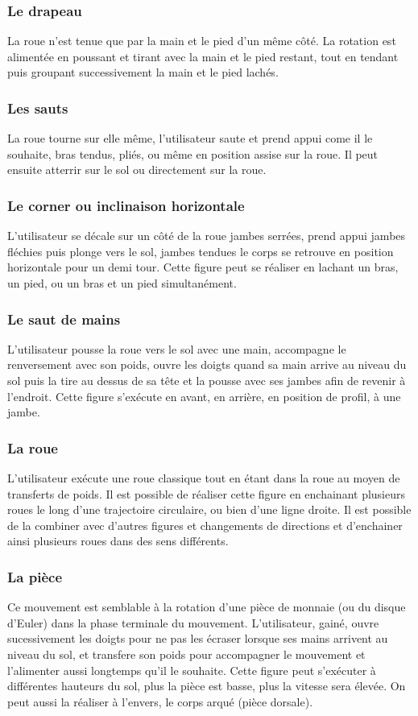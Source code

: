 \subsubsection{Le drapeau}
La roue n'est tenue que par la main et le pied d'un même côté. La rotation est alimentée en poussant et tirant avec la main et le pied restant, tout en tendant puis groupant successivement la main et le pied lachés.

\subsubsection{Les sauts}
La roue tourne sur elle même, l'utilisateur saute et prend appui come il le souhaite, bras tendus, pliés, ou même en position assise sur la roue. Il peut ensuite atterrir sur le sol ou directement sur la roue.

\subsubsection{Le corner ou inclinaison horizontale}
L'utilisateur se décale sur un côté de la roue jambes serrées, prend appui jambes fléchies puis plonge vers le sol, jambes tendues le corps se retrouve en position horizontale pour un demi tour. Cette figure peut se réaliser en lachant un bras, un pied, ou un bras et un pied simultanément.

\subsubsection{Le saut de mains}
L'utilisateur pousse la roue vers le sol avec une main, accompagne le renversement avec son poids, ouvre les doigts quand sa main arrive au niveau du sol puis la tire au dessus de sa tête et la pousse avec ses jambes afin de revenir à l'endroit. Cette figure s'exécute en avant, en arrière, en position de profil, à une jambe.

\subsubsection{La roue}
L'utilisateur exécute une roue classique tout en étant dans la roue au moyen de transferts de poids. Il est possible de réaliser cette figure en enchainant plusieurs roues le long d'une trajectoire circulaire, ou bien d'une ligne droite. Il est possible de la combiner avec d'autres figures et changements de directions et d'enchainer ainsi plusieurs roues dans des sens différents.

\subsubsection{La pièce}
Ce mouvement est semblable à la rotation d'une pièce de monnaie (ou du disque d'Euler) dans la phase terminale du mouvement. L'utilisateur, gainé, ouvre sucessivement les doigts pour ne pas les écraser lorsque ses mains arrivent au niveau du sol, et transfere son poids pour accompagner le mouvement et l'alimenter aussi longtemps qu'il le souhaite. Cette figure peut s'exécuter à différentes hauteurs du sol, plus la pièce est basse, plus la vitesse sera élevée. On peut aussi la réaliser à l'envers, le corps arqué (pièce dorsale).

